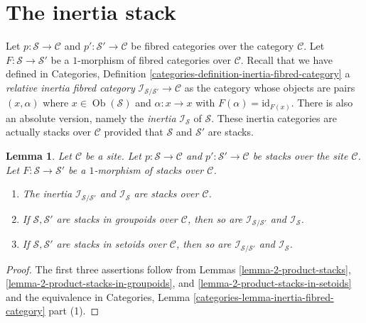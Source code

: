 \documentclass{stacks-project}
\theoremstyle{plain}
\newtheorem{lemma}[subsection]{Lemma}
\theoremstyle{definition}
\theoremstyle{remark}
\numberwithin{equation}{subsection}
\def\Ob{\mathop{\mathrm{Ob}}\nolimits}
\begin{document}
\section{The inertia stack}
\label{section-the-inertia-stack}

\noindent
Let
$p : \mathcal{S} \to \mathcal{C}$ and
$p' : \mathcal{S}' \to \mathcal{C}$
be fibred categories over the category $\mathcal{C}$.
Let $F : \mathcal{S} \to \mathcal{S}'$ be a $1$-morphism of
fibred categories over $\mathcal{C}$.
Recall that we have defined in
Categories, Definition \ref{categories-definition-inertia-fibred-category}
a {\it relative inertia fibred category}
$\mathcal{I}_{\mathcal{S}/\mathcal{S}'} \to \mathcal{C}$ as the
category whose objects are pairs $(x , \alpha)$ where
$x \in \Ob(\mathcal{S})$ and $\alpha : x \to x$ with
$F(\alpha) = \text{id}_{F(x)}$. There is also an absolute version,
namely the {\it inertia} $\mathcal{I}_\mathcal{S}$ of $\mathcal{S}$.
These inertia categories are actually stacks over $\mathcal{C}$ provided
that $\mathcal{S}$ and $\mathcal{S}'$ are stacks.

\begin{lemma}
\label{lemma-inertia}
Let $\mathcal{C}$ be a site. Let
$p : \mathcal{S} \to \mathcal{C}$ and
$p' : \mathcal{S}' \to \mathcal{C}$
be stacks over the site $\mathcal{C}$.
Let $F : \mathcal{S} \to \mathcal{S}'$ be a $1$-morphism of
stacks over $\mathcal{C}$.
\begin{enumerate}
\item The inertia $\mathcal{I}_{\mathcal{S}/\mathcal{S}'}$ and
$\mathcal{I}_\mathcal{S}$ are stacks over $\mathcal{C}$.
\item If $\mathcal{S}, \mathcal{S}'$ are stacks in groupoids over
$\mathcal{C}$, then so are $\mathcal{I}_{\mathcal{S}/\mathcal{S}'}$ and
$\mathcal{I}_\mathcal{S}$.
\item If $\mathcal{S}, \mathcal{S}'$ are stacks in setoids over $\mathcal{C}$,
then so are $\mathcal{I}_{\mathcal{S}/\mathcal{S}'}$ and
$\mathcal{I}_\mathcal{S}$.
\end{enumerate}
\end{lemma}

\begin{proof}
The first three assertions follow from
Lemmas \ref{lemma-2-product-stacks},
\ref{lemma-2-product-stacks-in-groupoids}, and
\ref{lemma-2-product-stacks-in-setoids}
and the equivalence in
Categories, Lemma \ref{categories-lemma-inertia-fibred-category} part (1).
\end{proof}
\end{document}
